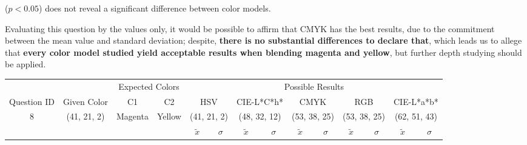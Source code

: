 ($p < 0.05$) does not reveal a significant difference between color models. \par
%
Evaluating this question by the values only, it would be possible to affirm that CMYK has the best results, due to the commitment between the mean value and standard deviation; despite,
\textbf{there is no substantial differences to declare that}, which leads us to allege that \textbf{every color model studied yield acceptable results when blending magenta and yellow},
but further depth studying should be applied.
%
\begin{table}[H]
  \resizebox{\textwidth}{!} {
  \begin{tabular}{lccccccccccccc}
    \hline
    \multicolumn{1}{c}{}                              &                                      & \multicolumn{2}{c}{Expected Colors}                   & \multicolumn{10}{c}{Possible Results}                                                                                                                                                                                                                                                                                        \\ \cline{3-14}
    \multicolumn{1}{c}{\multirow{-2}{*}{Question ID}} & \multirow{-2}{*}{Given Color}        & C1                       & C2                         & \multicolumn{2}{c}{HSV}                                        & \multicolumn{2}{c}{CIE-L*C*h*}                                 & \multicolumn{2}{c}{CMYK}                                       & \multicolumn{2}{c}{RGB}                                        & \multicolumn{2}{c}{CIE-L*a*b*}                                 \\ \hline
    \multicolumn{1}{c}{8}                             & \cellcolor[HTML]{FF0000}(41, 21, 2) & \multicolumn{1}{c|}{Magenta} & \multicolumn{1}{c|}{Yellow}  & \multicolumn{2}{c|}{\cellcolor[HTML]{FF0000}(41, 21, 2)}      & \multicolumn{2}{c|}{\cellcolor[HTML]{FF6755}(48, 32, 12)}       & \multicolumn{2}{c|}{\cellcolor[HTML]{FF8080}(53, 38, 25)}       & \multicolumn{2}{c|}{\cellcolor[HTML]{FF8080}(53, 38, 25)}       & \multicolumn{2}{c|}{\cellcolor[HTML]{FFA6A6}(62, 51, 43)}       \\ \hline
                                                      & \multicolumn{1}{l}{}                 & \multicolumn{1}{l}{}     & \multicolumn{1}{l}{}       & \multicolumn{1}{c}{$\tilde{x}$} & \multicolumn{1}{c}{$\sigma$} & \multicolumn{1}{c}{$\tilde{x}$} & \multicolumn{1}{c}{$\sigma$} & \multicolumn{1}{c}{$\tilde{x}$} & \multicolumn{1}{c}{$\sigma$} & \multicolumn{1}{c}{$\tilde{x}$} & \multicolumn{1}{c}{$\sigma$} & \multicolumn{1}{c}{$\tilde{x}$} & \multicolumn{1}{c}{$\sigma$} \\ \hline

\end{tabular}}
\end{table}
